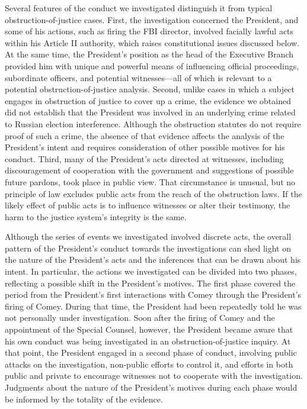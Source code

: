 Several features of the conduct we investigated distinguish it from typical obstruction-of-justice cases.
First, the investigation concerned the President, and some of his actions, such as firing the FBI director, involved facially lawful acts within his Article II authority, which raises constitutional issues discussed below.
At the same time, the President’s position as the head of the Executive Branch provided him with unique and powerful means of influencing official proceedings, subordinate officers, and potential witnesses---all of which is relevant to a potential obstruction-of-justice analysis.
Second, unlike cases in which a subject engages in obstruction of justice to cover up a crime, the evidence we obtained did not establish that the President was involved in an underlying crime related to Russian election interference.
Although the obstruction statutes do not require proof of such a crime, the absence of that evidence affects the analysis of the President’s intent and requires consideration of other possible motives for his conduct.
Third, many of the President’s acts directed at witnesses, including discouragement of cooperation with the government and suggestions of possible future pardons, took place in public view.
That circumstance is unusual, but no principle of law excludes public acts from the reach of the obstruction laws.
If the likely effect of public acts is to influence witnesses or alter their testimony, the harm to the justice system’s integrity is the same.

Although the series of events we investigated involved discrete acts, the overall pattern of the President’s conduct towards the investigations can shed light on the nature of the President’s acts and the inferences that can be drawn about his intent.
In particular, the actions we investigated can be divided into two phases, reflecting a possible shift in the President’s motives.
The first phase covered the period from the President’s first interactions with Comey through the President’s firing of Comey.
During that time, the President had been repeatedly told he was not personally under investigation.
Soon after the firing of Comey and the appointment of the Special Counsel, however, the President became aware that his own conduct was being investigated in an obstruction-of-justice inquiry.
At that point, the President engaged in a second phase of conduct, involving public attacks on the investigation, non-public efforts to control it, and efforts in both public and private to encourage witnesses not to cooperate with the investigation.
Judgments about the nature of the President’s motives during each phase would be informed by the totality of the evidence.

